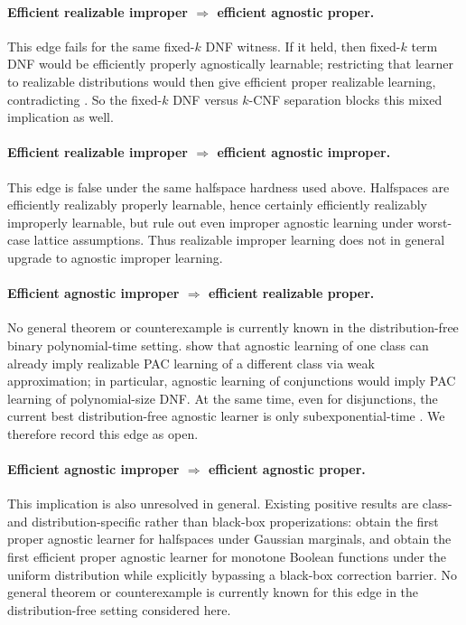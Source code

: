 \paragraph{Efficient realizable improper $\Rightarrow$ efficient agnostic proper.}
This edge fails for the same fixed-$k$ DNF witness. If it held, then fixed-$k$ term DNF would be efficiently properly agnostically learnable; restricting that learner to realizable distributions would then give efficient proper realizable learning, contradicting \citet[Theorem~3.2]{pitt1988}. So the fixed-$k$ DNF versus $k$-CNF separation blocks this mixed implication as well.

\paragraph{Efficient realizable improper $\Rightarrow$ efficient agnostic improper.}
This edge is false under the same halfspace hardness used above. Halfspaces are efficiently realizably properly learnable, hence certainly efficiently realizably improperly learnable, but \citet{tiegel2023} rule out even improper agnostic learning under worst-case lattice assumptions. Thus realizable improper learning does not in general upgrade to agnostic improper learning.

\paragraph{Efficient agnostic improper $\Rightarrow$ efficient realizable proper.}
No general theorem or counterexample is currently known in the distribution-free binary polynomial-time setting. \citet[Theorem~3]{kearns1994} show that agnostic learning of one class can already imply realizable PAC learning of a different class via weak approximation; in particular, agnostic learning of conjunctions would imply PAC learning of polynomial-size DNF. At the same time, even for disjunctions, the current best distribution-free agnostic learner is only subexponential-time \citep{diakonikolas2025disjunctions}. We therefore record this edge as open.

\paragraph{Efficient agnostic improper $\Rightarrow$ efficient agnostic proper.}
This implication is also unresolved in general. Existing positive results are class- and distribution-specific rather than black-box properizations: \citet{diakonikolas2021} obtain the first proper agnostic learner for halfspaces under Gaussian marginals, and \citet{lange2023} obtain the first efficient proper agnostic learner for monotone Boolean functions under the uniform distribution while explicitly bypassing a black-box correction barrier. No general theorem or counterexample is currently known for this edge in the distribution-free setting considered here.

